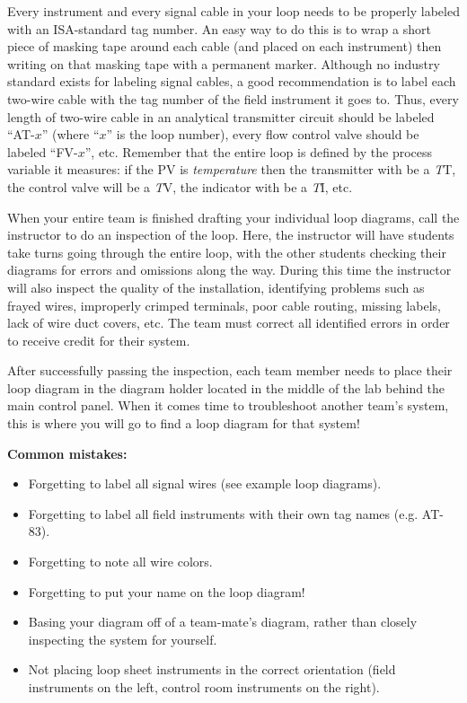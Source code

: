 Every instrument and every signal cable in your loop needs to be properly labeled with an ISA-standard tag number.  An easy way to do this is to wrap a short piece of masking tape around each cable (and placed on each instrument) then writing on that masking tape with a permanent marker.  Although no industry standard exists for labeling signal cables, a good recommendation is to label each two-wire cable with the tag number of the field instrument it goes to.  Thus, every length of two-wire cable in an analytical transmitter circuit should be labeled ``AT-$x$'' (where ``$x$'' is the loop number), every flow control valve should be labeled ``FV-$x$'', etc.  Remember that the entire loop is defined by the process variable it measures: if the PV is {\it temperature} then the transmitter with be a {\it T}T, the control valve will be a {\it T}V, the indicator with be a {\it T}I, etc.

When your entire team is finished drafting your individual loop diagrams, call the instructor to do an inspection of the loop.  Here, the instructor will have students take turns going through the entire loop, with the other students checking their diagrams for errors and omissions along the way.  During this time the instructor will also inspect the quality of the installation, identifying problems such as frayed wires, improperly crimped terminals, poor cable routing, missing labels, lack of wire duct covers, etc.  The team must correct all identified errors in order to receive credit for their system.  

After successfully passing the inspection, each team member needs to place their loop diagram in the diagram holder located in the middle of the lab behind the main control panel.  When it comes time to troubleshoot another team's system, this is where you will go to find a loop diagram for that system!

\vskip 10pt

{\bf Common mistakes:}

\begin{itemize}
\item{} Forgetting to label all signal wires (see example loop diagrams).
\item{} Forgetting to label all field instruments with their own tag names (e.g. AT-83).
\item{} Forgetting to note all wire colors.
\item{} Forgetting to put your name on the loop diagram!
\item{} Basing your diagram off of a team-mate's diagram, rather than closely inspecting the system for yourself.
\item{} Not placing loop sheet instruments in the correct orientation (field instruments on the left, control room instruments on the right).
\end{itemize}

